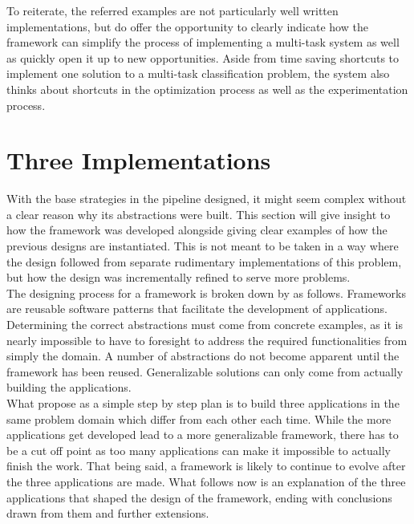 To reiterate, the referred examples are not particularly well written implementations, but do offer the opportunity to clearly indicate how the framework can simplify the process of implementing a multi-task system as well as quickly open it up to new opportunities. Aside from time saving shortcuts to implement one solution to a multi-task classification problem, the system also thinks about shortcuts in the optimization process as well as the experimentation process.\\


\section{Three Implementations} \label{Design:Implementations}

With the base strategies in the pipeline designed, it might seem complex without a clear reason why its abstractions were built. This section will give insight to how the framework was developed alongside giving clear examples of how the previous designs are instantiated. This is not meant to be taken in a way where the design followed from separate rudimentary implementations of this problem, but how the design was incrementally refined to serve more problems.\\

The designing process for a framework is broken down by \citet{roberts1996evolving} as follows. Frameworks are reusable software patterns that facilitate the development of applications. Determining the correct abstractions must come from concrete examples, as it is nearly impossible to have to foresight to address the required functionalities from simply the domain. A number of abstractions do not become apparent until the framework has been reused. Generalizable solutions can only come from actually building the applications. \\

What \citet{roberts1996evolving} propose as a simple step by step plan is to build three applications in the same problem domain which differ from each other each time. While the more applications get developed lead to a more generalizable framework, there has to be a cut off point as too many applications can make it impossible to actually finish the work. That being said, a framework is likely to continue to evolve after the three applications are made. What follows now is an explanation of the three applications that shaped the design of the framework, ending with conclusions drawn from them and further extensions. \\

